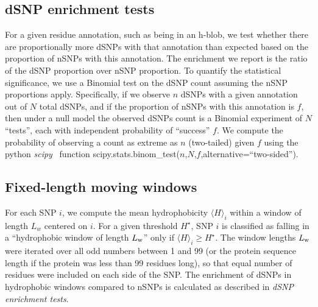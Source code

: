 \documentclass[9pt,twocolumn,twoside,lineno]{pnas-new}
\newcommand{\aucomment}[1]{}
\newcommand{\inserted}[1]{{#1}}
\newcommand{\Ht}{H^{\star}}
\newcommand{\Lw}{L_{\rm w}}
\begin{document}
\subsection*{dSNP enrichment tests}
\aucomment{This explanation is a major revision of the previous version.}
\inserted{For a given residue annotation, such as being in an h-blob, we test whether there are proportionally more dSNPs with that annotation than expected based on the proportion of nSNPs with this annotation. The enrichment we report is the ratio of the dSNP proportion over nSNP proportion. To quantify the statistical significance, we use a Binomial test on the dSNP count assuming the nSNP proportions apply. Specifically, if we observe $n$ dSNPs with a given annotation out of $N$ total dSNPs, and if the proportion of nSNPs with this annotation is $f$, then under a null model the observed dSNPs count is a Binomial experiment of $N$ ``tests'', each with independent probability of ``success'' $f$. We compute the probability of observing a count as extreme as $n$ (two-tailed) given $f$ using the python {\em scipy}~\cite{scipy2020} function scipy.stats.binom\_test($n$,$N$,$f$,alternative=``two-sided'').
}

\subsection*{Fixed-length moving windows}
 For each SNP $i$, we compute the mean hydrophobicity $\langle H \rangle_i$ within a window of length $L_w$ centered on $i$. For a given threshold $\Ht$, SNP $i$ is classified as falling in a  ``hydrophobic window of length $\Lw$'' only if $\langle H \rangle_i \geq \Ht$.  The window lengths $\Lw$ were iterated over all odd numbers between 1 and 99 (or the protein sequence length if the protein was less than 99 residues long), so that equal number of residues were included on each side of the SNP. The enrichment of dSNPs in hydrophobic windows compared to nSNPs is calculated as described in {\em dSNP enrichment tests}.
\end{document}
